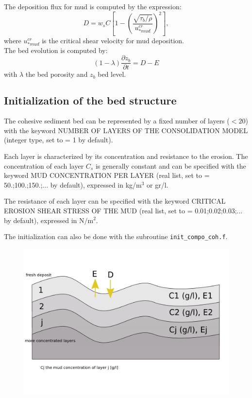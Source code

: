 The deposition flux for mud is computed by the expression:
\begin{equation}
D = w_{s} C \left[1-\left(\frac{\sqrt{\tau_b/\rho}}{u_{*mud}^{cr}}\right)^2 \right],
\end{equation}
where $u_{*mud}^{cr}$ is the critical shear velocity for mud deposition.\\

The bed evolution is computed by:
\begin{equation*}
(1-\lambda)\frac{\partial z_b}{\partial t} = D - E
\end{equation*}
with $\lambda$ the bed porosity and $z_b$ bed level.

\subsection{Initialization of the bed structure}
The cohesive sediment bed can be represented by a fixed number of layers ($<20$) with the keyword {\ttfamily NUMBER OF LAYERS OF THE CONSOLIDATION MODEL} (integer type, set to {\ttfamily = 1} by default).

Each layer is characterized by its concentration and resistance to the erosion. The concentration of each layer $C_s$ is generally constant and can be specified with the keyword {\ttfamily MUD CONCENTRATION PER LAYER} (real list, set to {\ttfamily = 50.;100.;150.;...} by default), expressed in kg/m$^3$ or gr/l.

The resistance of each layer can be specified with the keyword {\ttfamily CRITICAL EROSION SHEAR STRESS OF THE MUD} (real list, set to {\ttfamily = 0.01;0.02;0.03;...} by default), expressed in N/m$^2$.

The initialization can also be done with the subroutine \texttt{init\_compo\_coh.f}.

\begin{figure}[H]%
\begin{center}
\includegraphics[scale=0.3]{./graphics/consolidation.png}
\end{center}
\end{figure}

